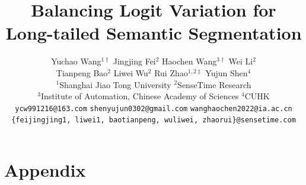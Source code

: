 \documentclass[10pt,twocolumn,letterpaper]{article}
\author{
    Yuchao Wang$^{1\dag}$ \quad
    Jingjing Fei$^{2}$ \quad
    Haochen Wang$^{3\dag}$ \quad
    Wei Li$^{2}$ \\
    Tianpeng Bao$^{2}$ \quad
    Liwei Wu$^2$ \quad
    Rui Zhao$^{1,2\ddagger}$ \quad
    Yujun Shen$^{4}$\\[5pt]
    $^1$Shanghai Jiao Tong University \quad
    $^2$SenseTime Research \\
    $^3$Institute of Automation, Chinese Academy of Sciences \quad
    $^4$CUHK \\
    \small{\texttt{ycw991216@163.com}} \quad
    \small{\texttt{shenyujun0302@gmail.com}} \quad  
    \small{\texttt{wanghaochen2022@ia.ac.cn}} \\
    \small{\texttt{\{feijingjing1, liwei1, baotianpeng, wuliwei, zhaorui\}@sensetime.com}} 
}
\begin{document}
\title{Balancing Logit Variation for Long-tailed Semantic Segmentation}
\maketitle








% 


\appendix


\section*{Appendix}
\maketitle

\end{document}
